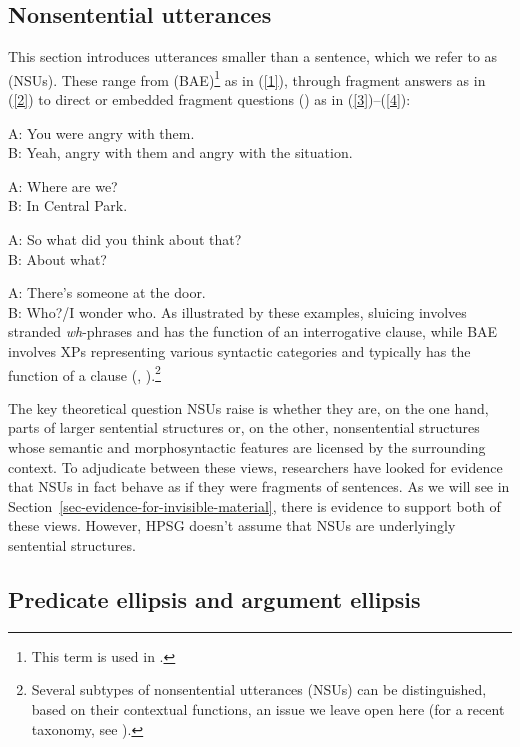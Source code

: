 \subsection{Nonsentential utterances}

This section introduces utterances smaller than a sentence, which we refer to as \emph{} (NSUs). These range from \emph{} (BAE)\footnote{This term is used in \citet{CJ2005a}.} as in (\ref{1}), through fragment answers as in (\ref{2})
to direct or embedded fragment questions () as in (\ref{3})--(\ref{4}):

\ea A: You were angry with them.\\ B: Yeah, angry with them and angry with the situation.\label{1}\z

\ea A: Where are we? \\B: In Central Park.\label{2}\z

\ea A: So what did you think about that?\\ B: About what? \label{3}\z

\ea A: There's someone at the door. \\B: Who?/I wonder who. \label{4}\z
%
As illustrated by these examples, sluicing involves stranded \emph{wh}-phrases and has the function of an interrogative clause, while BAE involves XPs representing various syntactic categories and typically has the function of a clause (\citealt[313]{Ginzburg:Sag:2000}, \citealt[233]{CJ2005a}).\footnote{Several subtypes of nonsentential utterances (NSUs) can be distinguished, based on their contextual functions, an issue we leave open here (for a recent taxonomy, see \citealt[217]{Ginzburg2012}).}

The key theoretical question NSUs raise is whether they are, on the one hand, parts of larger sentential structures or, on the other, nonsentential structures whose semantic and morphosyntactic features are licensed by the surrounding context. To adjudicate between these views, researchers have looked for evidence that NSUs in fact behave as if they were fragments of sentences. As we will see in Section~\ref{sec-evidence-for-invisible-material}, there is evidence to support both of these views. However, HPSG doesn't assume that NSUs are underlyingly sentential structures.

\subsection{Predicate ellipsis and argument ellipsis}
\label{ellipsis-sec-Predicate-ellipsis-and-argument-ellipsis}

